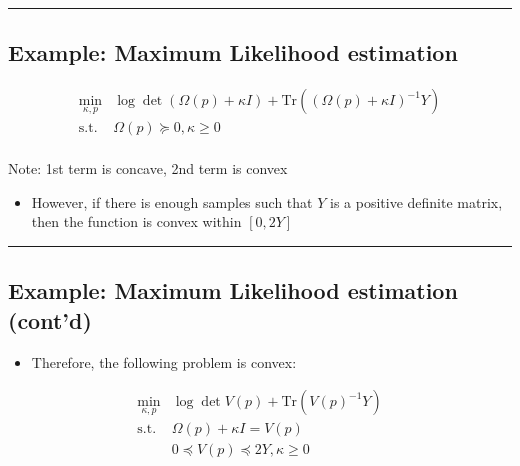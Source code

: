 \documentclass[]{article}
\providecommand{\tightlist}{%
  \setlength{\itemsep}{0pt}\setlength{\parskip}{0pt}}
\begin{document}
\begin{center}\rule{0.5\linewidth}{\linethickness}\end{center}

\hypertarget{example-maximum-likelihood-estimation}{%
\subsection{Example: Maximum Likelihood
estimation}\label{example-maximum-likelihood-estimation}}

\[\begin{array}{ll}
      \min_{\kappa, p}   &      \log \det (\Omega(p) + \kappa I) + \mathrm{Tr}((\Omega(p) + \kappa I)^{-1}Y) \\
      \text{s.t.} & \Omega(p) \succeq 0, \kappa \geq 0 \\
 \end{array}\]

Note: 1st term is concave, 2nd term is convex

\begin{itemize}
\tightlist
\item
  However, if there is enough samples such that \(Y\) is a positive
  definite matrix, then the function is convex within \([0, 2Y]\)
\end{itemize}

\begin{center}\rule{0.5\linewidth}{\linethickness}\end{center}

\hypertarget{example-maximum-likelihood-estimation-contd}{%
\subsection{Example: Maximum Likelihood estimation
(cont'd)}\label{example-maximum-likelihood-estimation-contd}}

\begin{itemize}
\tightlist
\item
  Therefore, the following problem is convex:
\end{itemize}

\[\begin{array}{ll}
      \min_{\kappa, p}   &   \log \det V(p) + \mathrm{Tr}(V(p)^{-1}Y) \\
      \text{s.t.} & \Omega(p) + \kappa I = V(p) \\
                    & 0 \preceq V(p) \preceq 2Y, \kappa \geq 0
\end{array}\]
\end{document}

